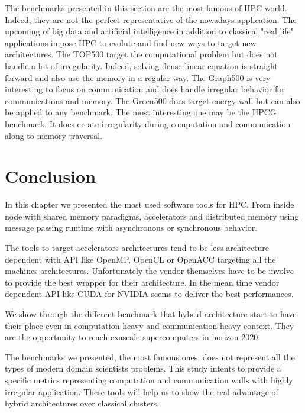 The benchmarks presented in this section are the most famous of HPC world. 
Indeed, they are not the perfect representative of the nowadays application. 
The upcoming of big data and artificial intelligence in addition to classical "real life" applications impose HPC to evolute and find new ways to target new architectures. 
The TOP500 target the computational problem but does not handle a lot of irregularity. 
Indeed, solving dense linear equation is straight forward and also use the memory in a regular way.
The Graph500 is very interesting to focus on communication and does handle irregular behavior for communications and memory. 
The Green500 does target energy wall but can also be applied to any benchmark. 
The most interesting one may be the HPCG benchmark. 
It does create irregularity during computation and communication along to memory traversal. 

\section{Conclusion}
In this chapter we presented the most used software tools for HPC. 
From inside node with shared memory paradigms, accelerators and distributed memory using message passing runtime with asynchronous or synchronous behavior. 

The tools to target accelerators architectures tend to be less architecture dependent with API like OpenMP, OpenCL or OpenACC targeting all the machines architectures. 
Unfortunately the vendor themselves have to be involve to provide the best wrapper for their architecture. 
In the mean time vendor dependent API like CUDA for NVIDIA seems to deliver the best performances.

We show through the different benchmark that hybrid architecture start to have their place even in computation heavy and communication heavy context. 
They are the opportunity to reach exascale supercomputers in horizon 2020.  

The benchmarks we presented, the most famous ones, does not represent all the types of modern domain scientists problems. 
This study intents to provide a specific metrics representing computation and communication walls with highly irregular application. 
These tools will help us to show the real advantage of hybrid architectures over classical clusters.
